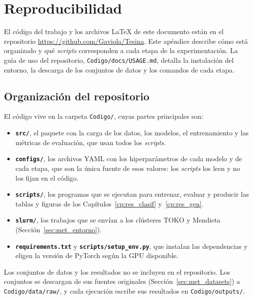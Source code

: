 \chapter{Reproducibilidad}
\label{ap:reproducibilidad}

El código del trabajo y los archivos \LaTeX{} de este documento están en el repositorio
\url{https://github.com/Gaviola/Tesina}. Este apéndice describe cómo está organizado y qué \emph{scripts} corresponden
a cada etapa de la experimentación. La guía de uso del repositorio, \texttt{Codigo/docs/USAGE.md}, detalla la
instalación del entorno, la descarga de los conjuntos de datos y los comandos de cada etapa.

\section{Organización del repositorio}
\label{sec:ap_repositorio}

El código vive en la carpeta \texttt{Codigo/}, cuyas partes principales son:
\begin{itemize}
    \item \textbf{\texttt{src/}}, el paquete con la carga de los datos, los modelos, el entrenamiento y las métricas
    de evaluación, que usan todos los \emph{scripts}.
    \item \textbf{\texttt{configs/}}, los archivos YAML con los hiperparámetros de cada modelo y de cada etapa, que
    son la única fuente de esos valores: los \emph{scripts} los leen y no los fijan en el código.
    \item \textbf{\texttt{scripts/}}, los programas que se ejecutan para entrenar, evaluar y producir las tablas y
    figuras de los Capítulos~\ref{cp:res_clasif} y~\ref{cp:res_gen}.
    \item \textbf{\texttt{slurm/}}, los trabajos que se envían a los clústeres TOKO y Mendieta
    (Sección~\ref{sec:met_entorno}).
    \item \textbf{\texttt{requirements.txt}} y \textbf{\texttt{scripts/setup\_env.py}}, que instalan las dependencias
    y eligen la versión de PyTorch según la GPU disponible.
\end{itemize}
Los conjuntos de datos y los resultados no se incluyen en el repositorio. Los conjuntos se descargan de sus fuentes
originales (Sección~\ref{sec:met_datasets}) a \texttt{Codigo/data/raw/}, y cada ejecución escribe sus resultados en
\texttt{Codigo/outputs/}.


